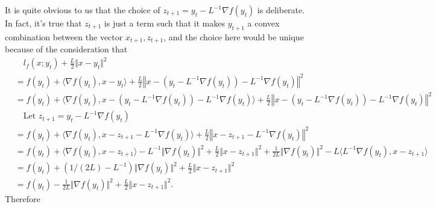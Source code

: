         \begin{remark}
            It is quite obvious to us that the choice of $z_{t + 1} = y_t - L^{-1}\nabla f(y_t)$ is deliberate. 
            In fact, it's true that $z_{t + 1}$ is just a term such that it makes $y_{t +1}$ a convex combination between the vector $x_{t + 1}, z_{t + 1}$, and the choice here would be unique because of the consideration that 
            {\footnotesize
            \begin{align*}
                & \quad 
                l_f(x; y_t) + \frac{L}{2}\Vert x - y_t\Vert^2 
                \\
                &= 
                f(y_t) + \langle \nabla f(y_t), x - y_t\rangle 
                + 
                \frac{L}{2}
                \left\Vert 
                    x - (y_t - L^{-1}\nabla f(y_t)) - L^{-1}\nabla f(y_t)
                \right\Vert^2
                \\
                &= 
                f(y_t) + 
                \langle \nabla f(y_t), x - (y_t - L^{-1}\nabla f(y_t)) - L^{-1}\nabla f(y_t)\rangle 
                + 
                \frac{L}{2}
                \left\Vert 
                    x - (y_t - L^{-1}\nabla f(y_t)) - L^{-1}\nabla f(y_t)
                \right\Vert^2
                \\
                &\quad  \text{Let }z_{t + 1} 
                = y_t - L^{-1}\nabla f(y_t)
                \\
                &= f(y_t) + \langle \nabla f(y_t), x - z_{t + 1} - L^{-1}\nabla f(y_t)\rangle
                + 
                \frac{L}{2}\left\Vert
                    x - z_{t + 1} - L^{-1}\nabla f(y_t)
                \right\Vert^2
                \\
                &= 
                f(y_t) + \langle \nabla f(y_t), x - z_{t + 1}\rangle 
                - L^{-1}\Vert \nabla f(y_t)\Vert^2
                + 
                \frac{L}{2}\Vert x - z_{t + 1}\Vert^2 + 
                \frac{1}{2L}\Vert \nabla f(y_t)\Vert^2 - 
                L\langle L^{-1}\nabla f(y_t), x - z_{t + 1}\rangle
                \\
                &= f(y_t) + (1/(2L)- L^{-1})\Vert \nabla f(y_t) \Vert^2 + 
                \frac{L}{2}\Vert x - z_{t + 1}\Vert^2
                \\
                &= f(y_t) - \frac{1}{2L}\Vert \nabla f(y_t)\Vert^2 + \frac{L}{2}\Vert x - z_{t + 1}\Vert^2. 
            \end{align*}
            }
            Therefore 
            \begin{align*}

\end{align*}
\end{remark}
